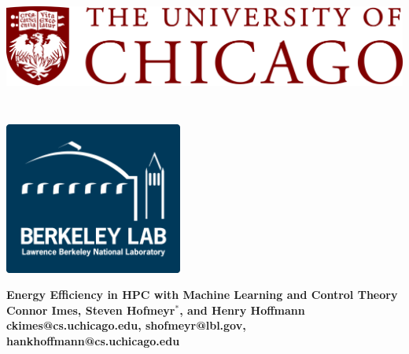 \documentclass[a0,portrait]{a0poster}
\begin{document}

\begin{minipage}[b]{\linewidth}
\begin{center}
\includegraphics[height=5cm]{figures/uchicago_logo.png} %
\hspace{42cm}
\includegraphics[height=5cm]{figures/lbnl_logo.png}\\
\vspace{0.5cm}
\noindent\makebox[\linewidth]{\rule{0.9\paperwidth}{0.4pt}}
\vspace{0.5cm}
\end{center}

\Huge \color{NavyBlue} \textbf{Energy Efficiency in HPC with Machine Learning and Control Theory} \color{Black}\\[0.5cm] %
\huge \textbf{Connor Imes, Steven Hofmeyr$^{*}$, and Henry Hoffmann}\\[0.25cm] %
\LARGE \textbf{ckimes@cs.uchicago.edu, shofmeyr@lbl.gov, hankhoffmann@cs.uchicago.edu}
\end{minipage}
%
\end{document}
